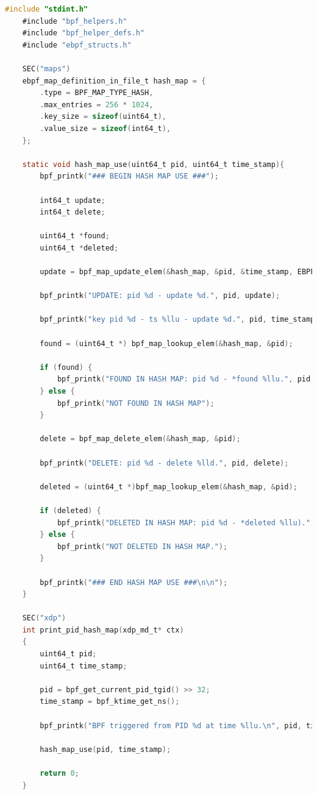 \begin{lstlisting}[style=cstyle, language=C, caption={Code of the program that uses a map in windows-ebpf-starter.}, title=hash\_map\_use.c]
	#include "stdint.h"
	#include "bpf_helpers.h"
	#include "bpf_helper_defs.h"
	#include "ebpf_structs.h"
	
	SEC("maps")
	ebpf_map_definition_in_file_t hash_map = {
		.type = BPF_MAP_TYPE_HASH,
		.max_entries = 256 * 1024,
		.key_size = sizeof(uint64_t),
		.value_size = sizeof(int64_t),
	};
	
	static void hash_map_use(uint64_t pid, uint64_t time_stamp){
		bpf_printk("### BEGIN HASH MAP USE ###");
		
		int64_t update;
		int64_t delete;
		
		uint64_t *found;
		uint64_t *deleted;
		
		update = bpf_map_update_elem(&hash_map, &pid, &time_stamp, EBPF_ANY);
		
		bpf_printk("UPDATE: pid %d - update %d.", pid, update);
		
		bpf_printk("key pid %d - ts %llu - update %d.", pid, time_stamp, update);
		
		found = (uint64_t *) bpf_map_lookup_elem(&hash_map, &pid);
		
		if (found) {
			bpf_printk("FOUND IN HASH MAP: pid %d - *found %llu.", pid, *found);
		} else {
			bpf_printk("NOT FOUND IN HASH MAP");
		}
		
		delete = bpf_map_delete_elem(&hash_map, &pid);
		
		bpf_printk("DELETE: pid %d - delete %lld.", pid, delete);
		
		deleted = (uint64_t *)bpf_map_lookup_elem(&hash_map, &pid);
		
		if (deleted) {
			bpf_printk("DELETED IN HASH MAP: pid %d - *deleted %llu).", pid, *deleted);
		} else {
			bpf_printk("NOT DELETED IN HASH MAP.");
		}
		
		bpf_printk("### END HASH MAP USE ###\n\n");
	}
	
	SEC("xdp")
	int print_pid_hash_map(xdp_md_t* ctx)
	{
		uint64_t pid;
		uint64_t time_stamp;
		
		pid = bpf_get_current_pid_tgid() >> 32;
		time_stamp = bpf_ktime_get_ns(); 
		
		bpf_printk("BPF triggered from PID %d at time %llu.\n", pid, time_stamp);
		
		hash_map_use(pid, time_stamp);
		
		return 0;
	}
\end{lstlisting}


